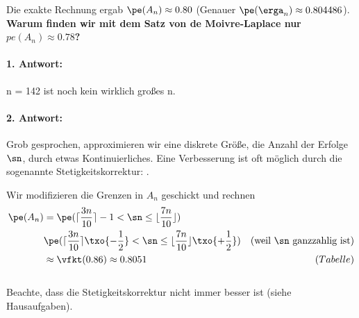 \begin{fr}
    Die exakte Rechnung ergab $\pe(A_n) \approx 0.80$ (Genauer $\pe(\erga_n) \approx 0.804486$).
    \textbf{Warum finden wir mit dem Satz von de Moivre-Laplace nur $pe(A_n) \approx 0.78$?}
    \paragraph{1. Antwort:} n = 142 ist noch kein wirklich großes n.

    \paragraph{2. Antwort:} Grob gesprochen, approximieren wir eine diskrete Größe, die
    Anzahl der Erfolge $\sn$, durch etwas Kontinuierliches.
    Eine Verbesserung ist oft
    möglich durch die sogenannte Stetigkeitskorrektur: .

    Wir modifizieren die Grenzen in $A_n$ geschickt und rechnen
    \begin{align*}
        \pe(A_n) & = \pe(\lceil \frac{3n}{10} \rceil -1  < \sn \leq \lfloor \frac{7n}{10} \rfloor) \\
        & \pe(\lceil \frac{3n}{10} \rceil \txo{- \frac{1}{2}}  < \sn \leq \lfloor \frac{7n}{10} \rfloor \txo{+
        \frac{1}{2}} ) & \text{(weil $\sn$ ganzzahlig ist)} \\
        & \approx \vfkt(0.86) \approx 0.8051 & (Tabelle)
    \end{align*}
     \\
    Beachte, dass die Stetigkeitskorrektur nicht immer besser ist (siehe Hausaufgaben).
\end{fr}

